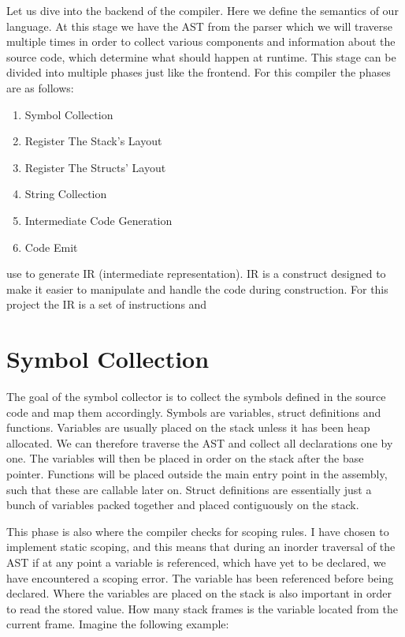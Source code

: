 Let us dive into the backend of the compiler. Here we define the semantics of our language. At this stage we have the AST from the parser which we will traverse multiple times in order to collect various components and information about the source code, which determine what should happen at runtime. This stage can be divided into multiple phases just like the frontend. For this compiler the phases are as follows: 
\begin{enumerate}
    \item Symbol Collection
    \item Register The Stack's Layout
    \item Register The Structs' Layout
    \item String Collection
    \item Intermediate Code Generation
    \item Code Emit
\end{enumerate}


use to generate IR (intermediate representation). IR is a construct designed to make it easier to manipulate and handle the code during construction. For this project the IR is a set of instructions and 

\section{Symbol Collection}
The goal of the symbol collector is to collect the symbols defined in the source code and map them accordingly. Symbols are variables, struct definitions and functions. Variables are usually placed on the stack unless it has been heap allocated. We can therefore traverse the AST and collect all declarations one by one. The variables will then be placed in order on the stack after the base pointer. Functions will be placed outside the main entry point in the assembly, such that these are callable later on. Struct definitions are essentially just a bunch of variables packed together and placed contiguously on the stack. 

This phase is also where the compiler checks for scoping rules. I have chosen to implement static scoping, and this means that during an inorder traversal of the AST if at any point a variable is referenced, which have yet to be declared, we have encountered a scoping error. The variable has been referenced before being declared. Where the variables are placed on the stack is also important in order to read the stored value. How many stack frames is the variable located from the current frame. Imagine the following example:

